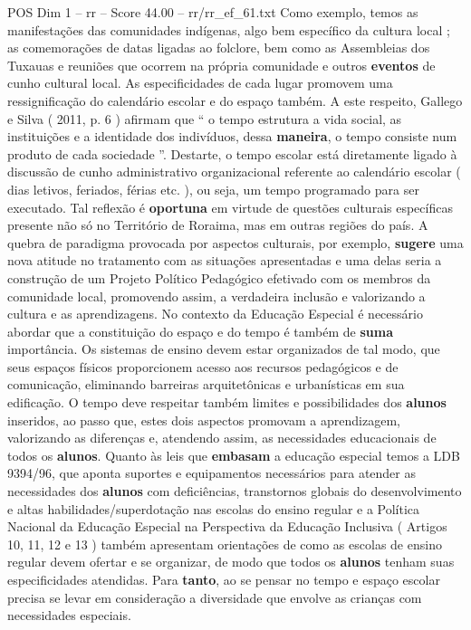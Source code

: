 \begin{textsample}{POS Dim 1 – rr – Score 44.00 – rr/rr\_ef\_61.txt}
Como exemplo, temos as manifestações das comunidades indígenas, algo bem específico da cultura local ; as comemorações de datas ligadas ao folclore, bem como as Assembleias dos Tuxauas e reuniões que ocorrem na própria comunidade e outros \textbf{eventos} de cunho cultural local.
As especificidades de cada lugar promovem uma ressignificação do calendário escolar e do espaço também.
A este respeito, Gallego e Silva ( 2011, p. 6 ) afirmam que “ o tempo estrutura a vida social, as instituições e a identidade dos indivíduos, dessa \textbf{maneira}, o tempo consiste num produto de cada sociedade ”.
Destarte, o tempo escolar está diretamente ligado à discussão de cunho administrativo organizacional referente ao calendário escolar ( dias letivos, feriados, férias etc. ), ou seja, um tempo programado para ser executado.
Tal reflexão é \textbf{oportuna} em virtude de questões culturais específicas presente não só no Território de Roraima, mas em outras regiões do país.
A quebra de paradigma provocada por aspectos culturais, por exemplo, \textbf{sugere} uma nova atitude no tratamento com as situações apresentadas e uma delas seria a construção de um Projeto Político Pedagógico efetivado com os membros da comunidade local, promovendo assim, a verdadeira inclusão e valorizando a cultura e as aprendizagens.
No contexto da Educação Especial é necessário abordar que a constituição do espaço e do tempo é também de \textbf{suma} importância.
Os sistemas de ensino devem estar organizados de tal modo, que seus espaços físicos proporcionem acesso aos recursos pedagógicos e de comunicação, eliminando barreiras arquitetônicas e urbanísticas em sua edificação.
O tempo deve respeitar também limites e possibilidades dos \textbf{alunos} inseridos, ao passo que, estes dois aspectos promovam a aprendizagem, valorizando as diferenças e, atendendo assim, as necessidades educacionais de todos os \textbf{alunos}.
Quanto às leis que \textbf{embasam} a educação especial temos a LDB 9394/96, que aponta suportes e equipamentos necessários para atender as necessidades dos \textbf{alunos} com deficiências, transtornos globais do desenvolvimento e altas habilidades/superdotação nas escolas do ensino regular e a Política Nacional da Educação Especial na Perspectiva da Educação Inclusiva ( Artigos 10, 11, 12 e 13 ) também apresentam orientações de como as escolas de ensino regular devem ofertar e se organizar, de modo que todos os \textbf{alunos} tenham suas especificidades atendidas.
Para \textbf{tanto}, ao se pensar no tempo e espaço escolar precisa se levar em consideração a diversidade que envolve as crianças com necessidades especiais.

\end{textsample}
